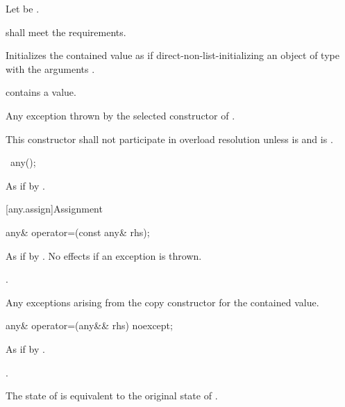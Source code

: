 \begin{itemdescr}
\pnum
Let  be .

\pnum
\requires {} shall meet the  requirements.

\pnum
\effects
Initializes the contained value as if direct-non-list-initializing an object of
type  with the arguments .

\pnum
\ensures
{} contains a value.

\pnum
\throws
Any exception thrown by the selected constructor of .

\pnum
\remarks
This constructor shall not participate in overload resolution unless
 is  and
 is .
\end{itemdescr}

\begin{itemdecl}
~any();
\end{itemdecl}

\begin{itemdescr}
\pnum
\effects
As if by .
\end{itemdescr}

[any.assign]{Assignment}

%
\begin{itemdecl}
any& operator=(const any& rhs);
\end{itemdecl}

\begin{itemdescr}
\pnum
\effects
As if by .
No effects if an exception is thrown.

\pnum
\returns
{}.

\pnum
\throws
Any exceptions arising from the copy constructor for the contained value.
\end{itemdescr}

%
\begin{itemdecl}
any& operator=(any&& rhs) noexcept;
\end{itemdecl}

\begin{itemdescr}
\pnum
\effects
As if by .

\pnum
\returns
{}.

\pnum
\ensures
The state of  is equivalent to the original state of .
\end{itemdescr}

